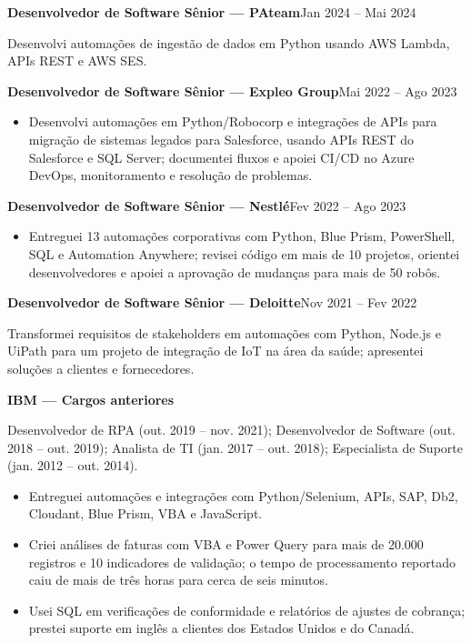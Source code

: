 \documentclass[10pt,a4paper]{article}
\newcommand{\role}[3]{\textbf{#1 --- #2}\hfill {\small #3}\par}
\begin{document}
\role{Desenvolvedor de Software Sênior}{PAteam}{Jan 2024 -- Mai 2024}
Desenvolvi automações de ingestão de dados em Python usando AWS Lambda, APIs REST e AWS SES.\par
\vspace{2pt}
\role{Desenvolvedor de Software Sênior}{Expleo Group}{Mai 2022 -- Ago 2023}
\begin{itemize}
  \item Desenvolvi automações em Python/Robocorp e integrações de APIs para migração de sistemas legados para Salesforce, usando APIs REST do Salesforce e SQL Server; documentei fluxos e apoiei CI/CD no Azure DevOps, monitoramento e resolução de problemas.
\end{itemize}
\vspace{1pt}
\role{Desenvolvedor de Software Sênior}{Nestl\'e}{Fev 2022 -- Ago 2023}
\begin{itemize}
  \item Entreguei 13 automações corporativas com Python, Blue Prism, PowerShell, SQL e Automation Anywhere; revisei código em mais de 10 projetos, orientei desenvolvedores e apoiei a aprovação de mudanças para mais de 50 robôs.
\end{itemize}
\vspace{1pt}
\role{Desenvolvedor de Software Sênior}{Deloitte}{Nov 2021 -- Fev 2022}
Transformei requisitos de stakeholders em automações com Python, Node.js e UiPath para um projeto de integração de IoT na área da saúde; apresentei soluções a clientes e fornecedores.\par
\vspace{2pt}
\textbf{IBM --- Cargos anteriores}\par
Desenvolvedor de RPA (out. 2019 -- nov. 2021); Desenvolvedor de Software (out. 2018 -- out. 2019); Analista de TI (jan. 2017 -- out. 2018); Especialista de Suporte (jan. 2012 -- out. 2014).\par
\begin{itemize}
  \item Entreguei automações e integrações com Python/Selenium, APIs, SAP, Db2, Cloudant, Blue Prism, VBA e JavaScript.
  \item Criei análises de faturas com VBA e Power Query para mais de 20.000 registros e 10 indicadores de validação; o tempo de processamento reportado caiu de mais de três horas para cerca de seis minutos.
  \item Usei SQL em verificações de conformidade e relatórios de ajustes de cobrança; prestei suporte em inglês a clientes dos Estados Unidos e do Canadá.
\end{itemize}
\end{document}
